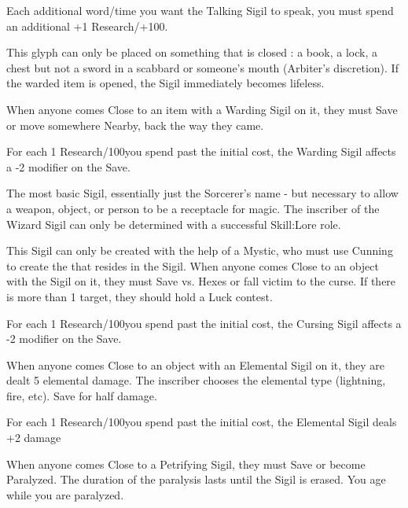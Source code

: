 {Each additional word/time you want the Talking Sigil to speak, you must spend an additional +1 Research/+100\FE.



This glyph can only be placed on something that is closed : a book, a lock, a chest but not a sword in a scabbard or someone's mouth (Arbiter's discretion).  If the warded item is opened, the Sigil immediately becomes lifeless.

When anyone comes Close to an item with a Warding Sigil on it, they must Save or move somewhere Nearby, back the way they came.  

For each 1 Research/100\FE you spend past the initial cost, the Warding Sigil affects a -2 modifier on the Save.



The most basic Sigil, essentially just the Sorcerer's name - but necessary to allow a weapon, object, or person to be a receptacle for magic.  The inscriber of the Wizard Sigil can only be determined with a successful Skill:Lore role.


\large{}\normalsize





This Sigil can only be created with the help of a Mystic, who must use Cunning to create the  that resides in the Sigil.  When anyone comes Close to an object with the Sigil on it, they must Save vs. Hexes or fall victim to the curse. If there is more than 1 target, they should hold a Luck contest.

For each 1 Research/100\AG you spend past the initial cost, the Cursing Sigil affects a -2 modifier on the Save.



When anyone comes Close to an object with an Elemental Sigil on it, they are dealt 5 elemental damage.  The inscriber chooses the elemental type (lightning, fire, etc).  Save for half damage.

For each 1 Research/100\AG you spend past the initial cost, the Elemental Sigil deals +2 damage



When anyone comes Close to a Petrifying Sigil, they must Save or become Paralyzed.  The duration of the paralysis lasts until the Sigil is erased. You age while you are paralyzed.

}
